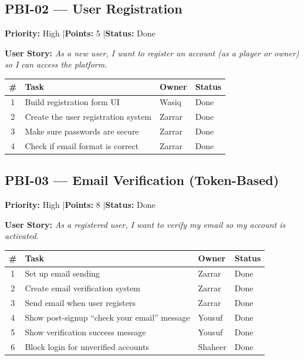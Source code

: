 \documentclass[12pt,a4paper]{article}
\begin{document}
\vspace{1.5em}

\subsection*{PBI-02 --- User Registration}
\textbf{Priority:} High \quad|\quad \textbf{Points:} 5 \quad|\quad \textbf{Status:} Done

\vspace{0.3em}
\textbf{User Story:} \textit{As a new user, I want to register an account (as a player or owner) so I can access the platform.}

\vspace{0.5em}
\noindent\renewcommand{\arraystretch}{1.3}
\begin{tabularx}{\textwidth}{|c|X|l|l|}
\hline
\rowcolor{headerbg}\color{white}\bfseries \# & \color{white}\bfseries Task & \color{white}\bfseries Owner & \color{white}\bfseries Status \\ \hline
1 & Build registration form UI & Wasiq & Done \\ \hline
\rowcolor{rowgray} 2 & Create the user registration system & Zarrar & Done \\ \hline
3 & Make sure passwords are secure & Zarrar & Done \\ \hline
\rowcolor{rowgray} 4 & Check if email format is correct & Zarrar & Done \\ \hline
\end{tabularx}

\vspace{1.5em}

\subsection*{PBI-03 --- Email Verification (Token-Based)}
\textbf{Priority:} High \quad|\quad \textbf{Points:} 8 \quad|\quad \textbf{Status:} Done

\vspace{0.3em}
\textbf{User Story:} \textit{As a registered user, I want to verify my email so my account is activated.}

\vspace{0.5em}
\noindent\renewcommand{\arraystretch}{1.3}
\begin{tabularx}{\textwidth}{|c|X|l|l|}
\hline
\rowcolor{headerbg}\color{white}\bfseries \# & \color{white}\bfseries Task & \color{white}\bfseries Owner & \color{white}\bfseries Status \\ \hline
1 & Set up email sending & Zarrar & Done \\ \hline
\rowcolor{rowgray} 2 & Create email verification system & Zarrar & Done \\ \hline
3 & Send email when user registers & Zarrar & Done \\ \hline
\rowcolor{rowgray} 4 & Show post-signup ``check your email'' message & Yousuf & Done \\ \hline
5 & Show verification success message & Yousuf & Done \\ \hline
\rowcolor{rowgray} 6 & Block login for unverified accounts & Shaheer & Done \\ \hline
\end{tabularx}
\end{document}
